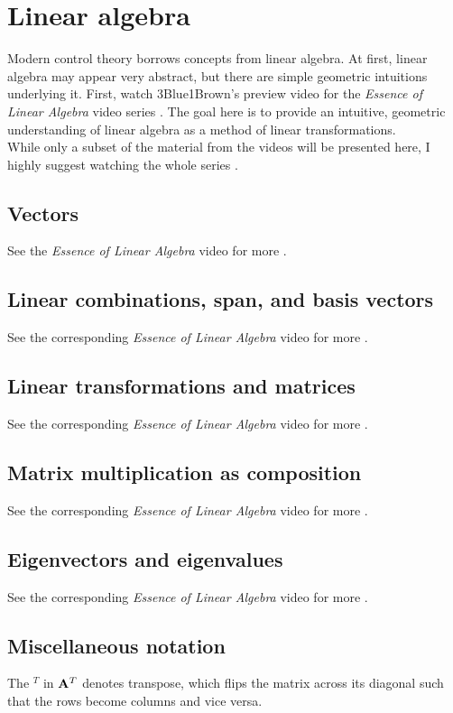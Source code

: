\section{Linear algebra}

Modern control theory borrows concepts from linear algebra. At first, linear
algebra may appear very abstract, but there are simple geometric intuitions
underlying it. First, watch 3Blue1Brown's preview video for the
\textit{Essence of Linear Algebra} video series \cite{bib:linalg_preview}. The
goal here is to provide an intuitive, geometric understanding of linear algebra
as a method of linear transformations. \\

While only a subset of the material from the videos will be presented here, I
highly suggest watching the whole series \cite{bib:essence_of_linalg}.

\subsection{Vectors}

See the \textit{Essence of Linear Algebra} video for more
\cite{bib:linalg_vectors}.

\subsection{Linear combinations, span, and basis vectors}

See the corresponding \textit{Essence of Linear Algebra} video for more
\cite{bib:linalg_linear_combinations}.

\subsection{Linear transformations and matrices}

See the corresponding \textit{Essence of Linear Algebra} video for more
\cite{bib:linalg_linear_transformations_and_matrices}.

\subsection{Matrix multiplication as composition}

See the corresponding \textit{Essence of Linear Algebra} video for more
\cite{bib:linalg_matrix_multiplication_as_composition}.

\subsection{Eigenvectors and eigenvalues}

See the corresponding \textit{Essence of Linear Algebra} video for more
\cite{bib:linalg_eigenvectors_and_eigenvalues}.

\subsection{Miscellaneous notation}

The $^T$ in $\mathbf{A}^T$ denotes transpose, which flips the matrix across its
diagonal such that the rows become columns and vice versa.
